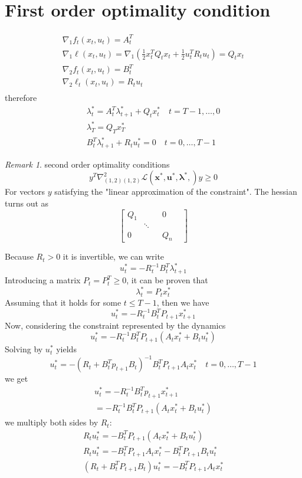 \documentclass[openany]{book}
\theoremstyle{definition}
\theoremstyle{remark}
\newtheorem*{remark}{Remark} %
\begin{document}
\section{First order optimality condition}
\begin{gather*}
    \nabla_1f_t(x_t,u_t) = A_t^T\\
    \nabla_1\ell(x_t,u_t) = \nabla_1(\displaystyle\frac{1}{2}x_t^TQ_tx_t+\displaystyle\frac{1}{2}u_t^TR_tu_t)=Q_tx_t\\
    \nabla_2f_t(x_t,u_t) = B_t^T\\
    \nabla_2\ell_t(x_t,u_t) = R_tu_t\\
\end{gather*}
therefore 
\begin{gather*}
    \lambda_t^* = A_t^T\lambda_{t+1}^* + Q_tx_t^* \quad t= T-1,\dots,0\\
    \lambda_T^* = Q_Tx_T^* \\
    B_t^T\lambda_{t+1}^* + R_tu_t^* = 0 \quad t=0,\dots,T-1
\end{gather*}
\begin{remark}
second order optimality conditions 
\[
    y^T\nabla^2_{(1,2)(1,2)}\mathcal{L}(\mathbf{x}^*,\mathbf{u}^*,\boldsymbol{\lambda}^*,)y \geq 0
\]
For vectors $y$ satisfying the "linear approximation of the constraint". The hessian turns out as 
\[
    \begin{bmatrix}
        Q_1 & & &  0\\
            & \ddots & & & \\ 
        0 & & & Q_n
    \end{bmatrix}
\]
\end{remark}
Because $R_t>0$ it is invertible, we can write 
\[
    u_t^* = -R_t^{-1}B_t^T\lambda_{t+1}^*
\]
Introducing a matrix $P_t=P_t^T \geq 0$, it can be proven that 
\[
    \lambda_t^* = P_tx_t^*
\]
Assuming that it holds for some $t\leq T-1$, then we have 
\[
    u_t^* = -R_t^{-1}B_t^TP_{t+1}x_{t+1}^*
\]
Now, considering the constraint represented by the dynamics 
\[
    u_t^* = -R_t^{-1}B_t^TP_{t+1}(A_tx_t^*+B_tu_t^*)
\]
Solving by $u^*_t$ yields 
\[
    u_t^* = -(R_t+B_t^Tp_{t+1}B_t)^{-1}B_t^TP_{t+1}A_tx^*_t \quad t=0,\dots,T-1
\]
we get 
\begin{gather*}
    u_t^* = -R_t^{-1}B_t^Tp_{t+1}x_{t+1}^* \\
    = -R_t^{-1}B_t^TP_{t+1}(A_tx_t^*+B_tu_t^*)
\end{gather*}
we multiply both sides by $R_t$: 
\begin{gather*}
    R_tu_t^* = -B_t^TP_{t+1}(A_tx_t^*+B_tu_t^*)\\
    R_tu_t^* = -B_t^TP_{t+1}A_tx_t^*-B_t^TP_{t+1}B_tu_t^*\\
    (R_t+B_t^TP_{t+1}B_t)u_t^* = -B_t^TP_{t+1}A_tx_t^*
\end{gather*}
\end{document}
